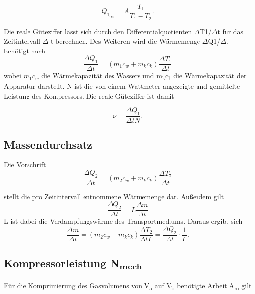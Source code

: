 \documentclass[titlepage=firstcover, captions=tableheading]{scrartcl}
\begin{document}
\begin{displaymath}
    Q_{1_{rev}} = A \frac{T_1}{T_1 - T_2}.
\end{displaymath} 


\noindent Die reale Güteziffer lässt sich durch den Differentialquotienten $\Delta$T1/$\Delta$t für das Zeitintervall $\Delta$ t berechnen.
Des Weiteren wird die Wärmemenge $\Delta$Q1/$\Delta$t benötigt nach 
\begin{displaymath}
    \frac{\Delta Q_1}{\Delta t} = (m_1c_w + m_kc_k)\frac{\Delta T_1}{\Delta t}
\end{displaymath}
wobei $m_1c_w$ die Wärmekapazität des Wassers und m\textsubscript{k}c\textsubscript{k} die Wärmekapazität der Apparatur darstellt.
 N ist die von einem Wattmeter angezeigte und gemittelte Leistung des Kompressors. Die reale Güteziffer ist damit 
 
 \begin{equation} \label{eqn:gute}
    \nu = \frac{\Delta Q_1} {\Delta t N}.
 \end{equation}

 \subsection{Massendurchsatz}

 Die Vorschrift 
\begin{displaymath}
    \frac{\Delta Q_2}{\Delta t}=(m_2c_w + m_kc_k)\frac{\Delta T_2}{\Delta t}
\end{displaymath}

 stellt die pro Zeitintervall entnommene Wärmemenge dar.
 Außerdem gilt 
 \begin{displaymath}
     \frac{\Delta Q_2}{\Delta t} = L\frac{\Delta m}{\Delta t}
 \end{displaymath} 
 L ist dabei die Verdampfungswärme des Transportmediums. 
 Daraus ergibt sich
\begin{equation} \label{massendurchsatz}
    \frac{\Delta m}{\Delta t} = (m_2c_w + m_kc_k)\frac{\Delta T_2}{\Delta t L}
    = \frac{\Delta Q_2}{\Delta t} \cdot \frac{1}{L}.
\end{equation}

\subsection{Kompressorleistung N\textsubscript{mech}}

Für die Komprimierung des Gasvolumens von V\textsubscript{a} auf V\textsubscript{b} benötigte Arbeit A\textsubscript{m} gilt 
\end{document}
